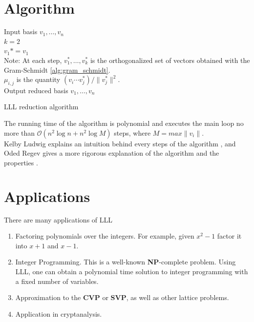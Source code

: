 \documentclass[a4paper,12pt]{report}
\begin{document}
\section{Algorithm}

\begin{algorithm}[H]
    \vspace*{5px}
    Input basis ${v_1, \ldots, v_n}$ \; \\
    $k = 2$ \; \\
    $v_1* = v_1$ \; \\
    Note: At each step, $v_1^*, \ldots, v_k^*$ is the orthogonalized set of vectors
    obtained with the Gram-Schmidt \ref{alg:gram_schmidt}. \\
    \vspace*{5px}
    $\mu_{i,j}$ is the quantity $(v_i \cdots v_j^*) / \lVert v_j^* \rVert^2$. \\
    Output reduced basis ${v_1, \ldots, v_n}$
    \caption{LLL reduction algorithm}
\end{algorithm}

The running time of the algorithm is polynomial and executes the main loop no more than
$\mathcal{O}(n^2\log n + n^2\log M)$ steps, where $M = max \lVert v_i \rVert$. \\

Kelby Ludwig explains an intuition behind every steps of the algorithm \cite{lllintuition}, and Oded Regev
gives a more rigorous explanation of the algorithm and the properties \cite{lllexplanation}.

\section{Applications}

There are many applications of LLL

\begin{enumerate}
    \item Factoring polynomials over the integers. For example, given $x^2 - 1$ factor it into $x + 1$ and $x - 1$.
    \item Integer Programming. This is a well-known \textbf{NP}-complete problem. Using LLL, one can obtain a polynomial time solution
          to integer programming with a fixed number of variables.
    \item Approximation to the \textbf{CVP} or \textbf{SVP}, as well as other lattice problems.
    \item Application in cryptanalysis.
\end{enumerate}
\end{document}

